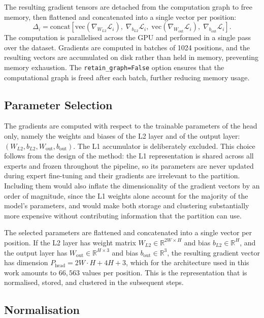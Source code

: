The resulting gradient tensors are detached from the computation graph to free memory, then flattened and concatenated into a single vector per position:
\[
\Delta_i = \mathrm{concat}\left[\mathrm{vec}(\nabla_{W_{L2}} \mathcal{L}_i),\; \nabla_{b_{L2}} \mathcal{L}_i,\; \mathrm{vec}(\nabla_{W_{\mathrm{out}}} \mathcal{L}_i),\; \nabla_{b_{\mathrm{out}}} \mathcal{L}_i\right].
\]
The computation is parallelised across the GPU and performed in a single pass over the dataset. Gradients are computed in batches of 1024 positions, and the resulting vectors are accumulated on disk rather than held in memory, preventing memory exhaustion. The \texttt{retain\_graph=False} option ensures that the computational graph is freed after each batch, further reducing memory usage.

\subsection{Parameter Selection}\label{sec:grad-params}

The gradients are computed with respect to the trainable parameters of the head only, namely the weights and biases of the L2 layer and of the output layer: \((W_{L2}, b_{L2}, W_{\mathrm{out}}, b_{\mathrm{out}})\). The L1 accumulator is deliberately excluded. This choice follows from the design of the method: the L1 representation is shared across all experts and frozen throughout the pipeline, so its parameters are never updated during expert fine-tuning and their gradients are irrelevant to the partition. Including them would also inflate the dimensionality of the gradient vectors by an order of magnitude, since the L1 weights alone account for the majority of the model's parameters, and would make both storage and clustering substantially more expensive without contributing information that the partition can use.

The selected parameters are flattened and concatenated into a single vector per position. If the L2 layer has weight matrix \(W_{L2} \in \mathbb{R}^{2W \times H}\) and bias \(b_{L2} \in \mathbb{R}^{H}\), and the output layer has \(W_{\mathrm{out}} \in \mathbb{R}^{H \times 3}\) and bias \(b_{\mathrm{out}} \in \mathbb{R}^{3}\), the resulting gradient vector has dimension \(P_{\mathrm{head}} = 2W \cdot H + 4H + 3\), which for the architecture used in this work amounts to \(66{,}563\) values per position. This is the representation that is normalised, stored, and clustered in the subsequent steps.

\subsection{Normalisation}\label{sec:grad-norm}


